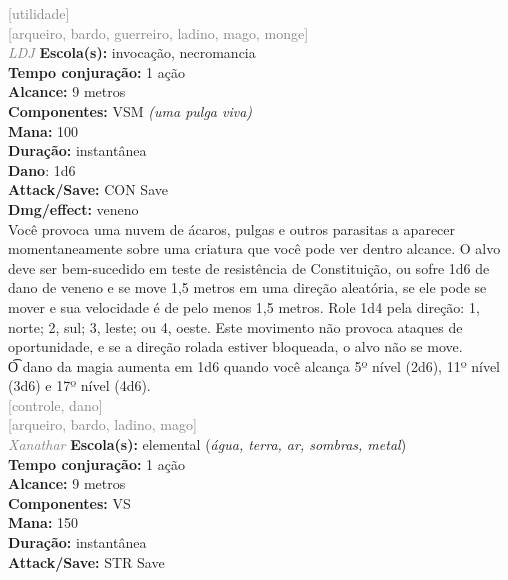 \documentclass{RPG_Adventure}[2021/10/20]
\begin{document}
{\scriptsize \textcolor{gray}{[utilidade]\\}}
{\scriptsize \textcolor{gray}{[arqueiro, bardo, guerreiro, ladino, mago, monge]\\}}
{\tiny \textcolor{gray}{\textit{LDJ}}}\jump{}
{\small \t \textbf{Escola(s):} invocação, necromancia\\\t \textbf{Tempo conjuração:} 1 ação\\\t \textbf{Alcance:} 9 metros\\\t \textbf{Componentes:} VSM \textit{(uma pulga viva)}\\\t \textbf{Mana:} 100\\\t \textbf{Duração:} instantânea\\\t \textbf{Dano}: 1d6\\\t \textbf{Attack/Save:} CON Save\\\t \textbf{Dmg/effect:} veneno\\}
{\normalsize Você provoca uma nuvem de ácaros, pulgas e outros parasitas a aparecer momentaneamente sobre uma criatura que você pode ver dentro alcance. O alvo deve ser bem-sucedido em teste de resistência de  Constituição, ou sofre 1d6 de dano de veneno e se move 1,5 metros em uma direção aleatória, se ele pode se mover e sua velocidade é de pelo menos 1,5 metros. Role 1d4 pela direção: 1, norte; 2, sul; 3, leste; ou 4, oeste. Este movimento não provoca ataques de oportunidade, e se a direção rolada estiver bloqueada, o alvo não se move.\\\t O dano da magia aumenta em 1d6 quando você alcança 5º nível (2d6), 11º nível (3d6) e 17º nível (4d6).\\}
{\scriptsize \textcolor{gray}{[controle, dano]\\}}
{\scriptsize \textcolor{gray}{[arqueiro, bardo, ladino, mago]\\}}
{\tiny \textcolor{gray}{\textit{Xanathar}}}\jump{}
{\small \t \textbf{Escola(s):} elemental (\textit{água, terra, ar, sombras, metal})\\\t \textbf{Tempo conjuração:} 1 ação\\\t \textbf{Alcance:} 9 metros\\\t \textbf{Componentes:} VS\\\t \textbf{Mana:} 150\\\t \textbf{Duração:} instantânea\\\t \textbf{Attack/Save:} STR Save\\}
\end{document}
